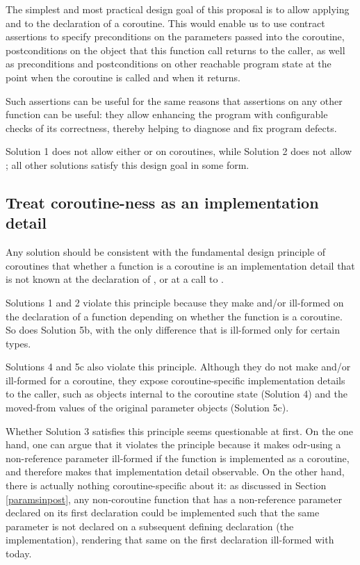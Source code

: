 The simplest and most practical design goal of this proposal is to allow applying  and  to the declaration of a coroutine. This would enable us to use contract assertions to specify preconditions on the parameters passed into the coroutine, postconditions on the object that this function call returns to the caller, as well as preconditions and postconditions on other reachable program state at the point when the coroutine is called and when it returns.

Such assertions can be useful for the same reasons that assertions on any other function can be useful: they allow enhancing the program with configurable checks of its correctness, thereby helping to diagnose and fix program defects.

Solution 1 does not allow either  or  on coroutines, while Solution 2 does not allow ; all other solutions satisfy this design goal in some form.

\subsection{Treat coroutine-ness as an implementation detail}
\label{goal_coro_principle}

Any solution should be consistent with the fundamental design principle of coroutines that whether a function  is a coroutine is an implementation detail that is not known at the declaration of , or at a call to .

Solutions 1 and 2 violate this principle because they make  and/or  ill-formed on the declaration of a function depending on whether the function is a coroutine. So does Solution 5b, with the only difference that  is ill-formed only for certain types. 

Solutions 4 and 5c also violate this principle. Although they do not make  and/or  ill-formed for a coroutine, they expose coroutine-specific implementation details to the caller, such as objects internal to the coroutine state (Solution 4) and the moved-from values of the original parameter objects (Solution 5c).

Whether Solution 3 satisfies this principle seems questionable at first. On the one hand, one can argue that it violates the principle because it makes odr-using a  non-reference parameter ill-formed if the function is implemented as a coroutine, and therefore makes that implementation detail observable. On the other hand, there is actually nothing coroutine-specific about it: as discussed in Section \ref{paramsinpost}, any non-coroutine function that has a non-reference parameter declared  on its first declaration could be implemented such that the same parameter is not declared  on a subsequent defining declaration (the implementation), rendering that same  on the first declaration ill-formed with \cite{P2900R8} today.

